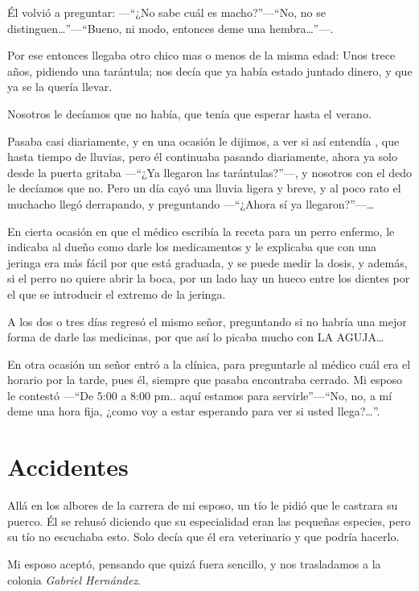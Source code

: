 \documentclass[letterpaper, 12pt]{book}
\begin{document}
Él volvió a preguntar: ---``¿No sabe cuál es macho?''---``No, no se distinguen\ldots''---``Bueno, ni modo, entonces deme una hembra\ldots''---.

Por ese entonces llegaba otro chico mas o menos de la misma edad: Unos trece años, pidiendo una tarántula; nos decía que ya había estado juntado dinero, y que ya se la quería llevar.

Nosotros le decíamos que no había, que tenía que esperar hasta el verano.

Pasaba casi diariamente, y en una ocasión le dijimos, a ver si así entendía , que hasta tiempo de lluvias, pero él continuaba pasando diariamente, ahora ya solo desde la puerta gritaba ---``¿Ya llegaron las tarántulas?''---, y nosotros con el dedo le decíamos que no. Pero un día cayó una lluvia ligera y breve, y al poco rato el muchacho llegó derrapando, y preguntando ---``¿Ahora sí ya llegaron?''---\ldots

En cierta ocasión en que el médico escribía la receta para un perro enfermo, le indicaba al dueño como darle los medicamentos y le explicaba que con una jeringa era más fácil por que está graduada, y se puede medir la dosis, y además, si el perro no quiere abrir la boca, por un lado hay un hueco entre los dientes por el que se introducir el extremo de la jeringa.

A los dos o tres días regresó el mismo señor, preguntando si no habría una mejor forma de darle las medicinas, por que así lo picaba mucho con LA AGUJA\ldots

En otra ocasión un señor entró a la clínica, para preguntarle al médico cuál era el horario por la tarde, pues él, siempre que pasaba encontraba cerrado. Mi esposo le contestó ---``De 5:00 a 8:00 pm.. aquí estamos para servirle''---``No, no, a mí deme una hora fija, ¿como voy a estar esperando para ver si usted llega?\ldots''.

\chapter{Accidentes}

Allá en los albores de la carrera de mi esposo, un tío le pidió que le castrara su puerco. Él se rehusó diciendo que su especialidad eran las pequeñas especies, pero su tío no escuchaba esto. Solo decía que él era veterinario y que podría hacerlo.

Mi esposo aceptó, pensando que quizá fuera sencillo, y nos trasladamos a la colonia {\it Gabriel Hernández}. 
\end{document}
